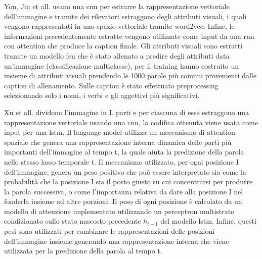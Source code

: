 You, Jin et all. \cite{you2016image} usano una \acrshort{cnn} per estrarre la rappresentazione vettoriale dell'immagine e tramite dei rilevatori estraggono degli attributi visuali, i quali vengono rappresentati in uno spazio vettoriale tramite word2vec. Infine, le informazioni precedentemente estratte vengono utilizzate come input da una \acrshort{rnn} con attention che produce la caption finale. Gli attributi visuali sono estratti tramite un modello \acrshort{fcn} che è stato allenato a predire degli attributi data un'immagine (classificazione multiclasse), per il training hanno costruito un insieme di attributi visuali prendendo le 1000 parole più comuni provenienti dalle caption di allenamento. Sulle caption è stato effettuato preprocessing selezionando solo i nomi, i verbi e gli aggettivi più significativi.

Xu et all. \cite{xu2015show} dividono l'immagine in L parti e per ciascuna di esse estraggono una rappresentazione vettoriale usando una \acrshort{cnn}, la codifica ottenuta viene usata come input per una \acrshort{lstm}.
Il language model utilizza un meccanismo di attention spaziale che genera una rappresentazione interna dinamica delle parti più importanti dell'immagine al tempo t, la quale aiuta la predizione della parola nello stesso lasso temporale t. Il meccanismo utilizzato, per ogni posizione I dell'immagine, genera un peso positivo che può essere interpretato sia come la probabilità che la posizione I sia il posto giusto su cui concentrarsi per produrre la parola successiva, o come l'importanza relativa da dare alla posizione I nel fonderla insieme ad altre porzioni. Il peso di ogni posizione è calcolato da un modello di attenzione implementato utilizzando un perceptron multistrato condizionato sullo stato nascosto precedente $h_{t-1}$ del modello \acrshort{lstm}. Infine, questi pesi sono utilizzati per combinare le rappresentazioni delle posizioni dell'immagine insieme generando una rappresentazione interna che viene utilizzata per la predizione della parola al tempo t.

